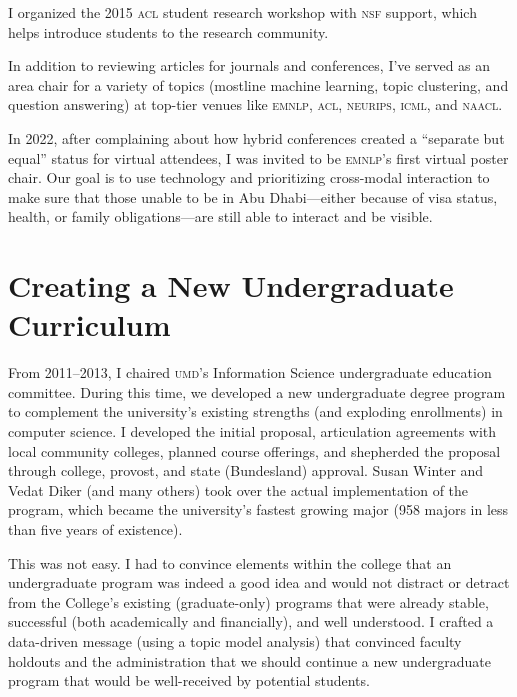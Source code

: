 \documentclass[11pt]{amsart}
\newcommand{\abr}[1]{\textsc{#1}}
\begin{document}
I organized the 2015 \abr{acl} student research workshop with
\abr{nsf} support, which helps introduce students to the research
community.

In addition to reviewing articles for journals and conferences, I've
served as an area chair for a variety of topics (mostline machine
learning, topic clustering, and question answering) at top-tier venues
like \abr{emnlp}, \abr{acl}, \abr{neurips}, \abr{icml}, and
\abr{naacl}.  

In 2022, after complaining about how hybrid conferences created a
``separate but equal'' status for virtual attendees, I was invited to
be \abr{emnlp}'s first virtual poster chair.
%
Our goal is to use technology and prioritizing cross-modal interaction
to make sure that those unable to be in Abu Dhabi---either because of
visa status, health, or family obligations---are still able to
interact and be visible.




\section{Creating a New Undergraduate Curriculum}

From 2011--2013, I chaired \abr{umd}'s Information Science undergraduate
education committee. During this time, we developed a new undergraduate degree
program to complement the university's existing strengths (and exploding
enrollments) in computer science. I developed the initial proposal,
articulation agreements with local community colleges, planned course
offerings, and shepherded the proposal through college, provost, and
state (Bundesland) approval.
%
Susan Winter and Vedat Diker (and many others) took over the actual
implementation of the program, which became the university's fastest growing
major (958 majors in less than five years of existence).

This was not easy.  I had to convince elements within the college that an undergraduate
program was indeed a good idea and would not distract or detract from the
College's existing (graduate-only) programs that were already stable,
successful (both academically and financially), and well understood.
%
I crafted a data-driven message (using a topic model analysis) that convinced
faculty holdouts and the administration that we should continue a new
undergraduate program that would be well-received by potential students.
\end{document}
